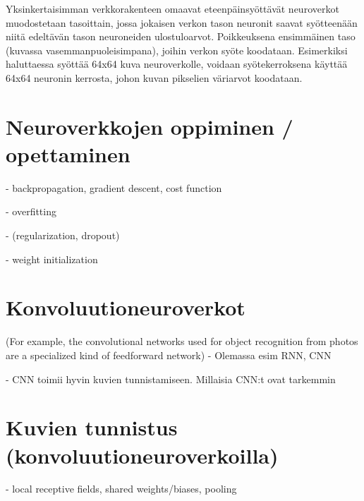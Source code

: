 \documentclass[11pt]{article}
\theoremstyle{plain}
\theoremstyle{definition}
\begin{document}
  Yksinkertaisimman verkkorakenteen omaavat eteenpäinsyöttävät neuroverkot muodostetaan tasoittain, jossa jokaisen verkon tason neuronit saavat syötteenään niitä edeltävän tason neuroneiden ulostuloarvot. Poikkeuksena ensimmäinen taso (kuvassa vasemmanpuoleisimpana), joihin verkon syöte koodataan. Esimerkiksi haluttaessa syöttää 64x64 kuva neuroverkolle, voidaan syötekerroksena käyttää 64x64 neuronin kerrosta, johon kuvan pikselien väriarvot koodataan.


  \section{Neuroverkkojen oppiminen / opettaminen}
  - backpropagation, gradient descent, cost function

  - overfitting

  - (regularization, dropout)

  - weight initialization

  \section{Konvoluutioneuroverkot}
   (For example, the convolutional networks used for object recognition from photos are a specialized kind of feedforward network)
  - Olemassa esim RNN, CNN

  - CNN toimii hyvin kuvien tunnistamiseen. Millaisia CNN:t ovat tarkemmin
  \section{Kuvien tunnistus (konvoluutioneuroverkoilla)}
  - local receptive fields, shared weights/biases, pooling

  \renewcommand{\refname}{Lähteet}
  
  

  
\end{document}
